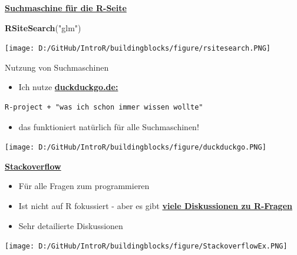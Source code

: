 \documentclass[ignorenonframetext,]{beamer}
\newenvironment{Shaded}{\begin{snugshade}}{\end{snugshade}}
\newcommand{\KeywordTok}[1]{\textcolor[rgb]{0.26,0.66,0.93}{\textbf{#1}}}
\newcommand{\NormalTok}[1]{\textcolor[rgb]{0.74,0.68,0.62}{#1}}
\newcommand{\StringTok}[1]{\textcolor[rgb]{0.02,0.61,0.04}{#1}}
\providecommand{\tightlist}{%
  \setlength{\itemsep}{0pt}\setlength{\parskip}{0pt}}
\begin{document}
\begin{frame}[fragile]{\href{http://search.r-project.org/cgi-bin/namazu.cgi?query=glm\&max=20\&result=normal\&sort=score\&idxname=functions\&idxname=vignettes\&idxname=views}{\textbf{Suchmaschine
für die R-Seite}}}
\protect\hypertarget{suchmaschine-fur-die-r-seite}{}

\begin{Shaded}
\begin{Highlighting}[]
\KeywordTok{RSiteSearch}\NormalTok{(}\StringTok{"glm"}\NormalTok{)}
\end{Highlighting}
\end{Shaded}

\texttt{[image: D:/GitHub/IntroR/buildingblocks/figure/rsitesearch.PNG]}

\end{frame}

\begin{frame}[fragile]{Nutzung von Suchmaschinen}
\protect\hypertarget{nutzung-von-suchmaschinen}{}

\begin{itemize}
\tightlist
\item
  Ich nutze \href{}{\textbf{duckduckgo.de:}}
\end{itemize}

\begin{verbatim}
R-project + "was ich schon immer wissen wollte" 
\end{verbatim}

\begin{itemize}
\tightlist
\item
  das funktioniert natürlich für alle Suchmaschinen!
\end{itemize}

\texttt{[image: D:/GitHub/IntroR/buildingblocks/figure/duckduckgo.PNG]}

\end{frame}

\begin{frame}{\href{http://stackoverflow.com/}{\textbf{Stackoverflow}}}
\protect\hypertarget{stackoverflow}{}

\begin{itemize}
\tightlist
\item
  Für alle Fragen zum programmieren
\item
  Ist nicht auf R fokussiert - aber es gibt
  \href{https://stackoverflow.com/tags/r/info}{\textbf{viele
  Diskussionen zu R-Fragen}}
\item
  Sehr detailierte Diskussionen
\end{itemize}

\texttt{[image: D:/GitHub/IntroR/buildingblocks/figure/StackoverflowEx.PNG]}

\end{frame}
\end{document}
